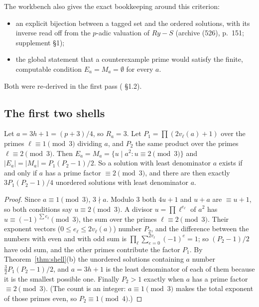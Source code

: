 The workbench also gives the exact bookkeeping around this criterion:
\begin{itemize}
\item an explicit bijection between a tagged set and the ordered solutions, with its inverse read off from the $p$-adic valuation of $Ry-S$ (archive (526), p.~151; supplement §1);
\item the global statement that a counterexample prime would satisfy the finite, computable condition $E_a=M_a=\emptyset$ for every $a$.
\end{itemize}
Both were re-derived in the first pass ( §1.2).

\subsection{The first two shells}

\begin{proposition}\label{prop:r3}
Let $a=3h+1=(p+3)/4$, so $R_a=3$. Let $P_1=\prod(2v_\ell(a)+1)$ over the primes $\ell\equiv1\pmod3$ dividing $a$, and $P_2$ the same product over the primes $\ell\equiv2\pmod3$. Then $E_a=M_a=\{u\mid a^2: u\equiv2\pmod3\}$ and $|E_a|=|M_a|=P_1(P_2-1)/2$. So a solution with least denominator $a$ exists if and only if $a$ has a prime factor $\equiv2\pmod3$, and there are then exactly $3P_1(P_2-1)/4$ unordered solutions with least denominator $a$.
\end{proposition}

\begin{proof}
Since $a\equiv1\pmod3$, $3\nmid a$. Modulo $3$ both $4u+1$ and $u+a$ are $\equiv u+1$, so both conditions say $u\equiv2\pmod3$. A divisor $u=\prod\ell^{e_\ell}$ of $a^2$ has $u\equiv(-1)^{\sum e_\ell}\pmod3$, the sum over the primes $\ell\equiv2\pmod3$. Their exponent vectors ($0\le e_\ell\le2v_\ell(a)$) number $P_2$, and the difference between the numbers with even and with odd sum is $\prod_\ell\sum_{e=0}^{2v_\ell}(-1)^e=1$; so $(P_2-1)/2$ have odd sum, and the other primes contribute the factor $P_1$. By Theorem~\ref{thm:shell}(b) the unordered solutions containing $a$ number $\tfrac32P_1(P_2-1)/2$, and $a=3h+1$ is the least denominator of each of them because it is the smallest possible one. Finally $P_2>1$ exactly when $a$ has a prime factor $\equiv2\pmod3$. (The count is an integer: $a\equiv1\pmod 3$ makes the total exponent of those primes even, so $P_2\equiv1\pmod4$.)
\end{proof}

